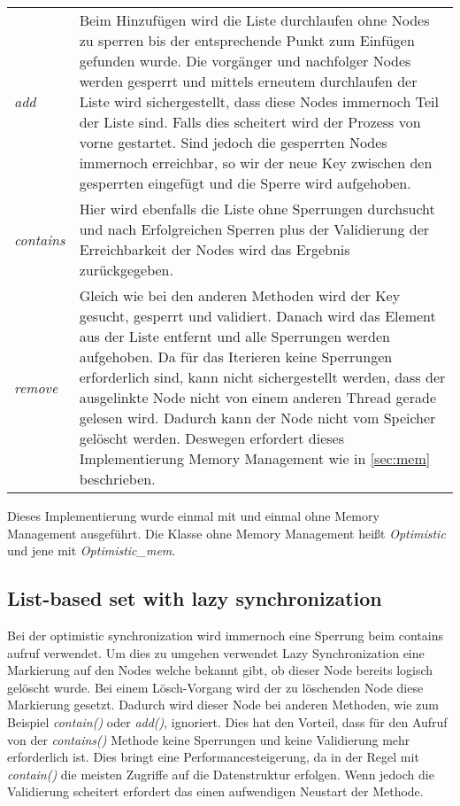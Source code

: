 \begin{table}[H]
    \begin{tabularx}{\textwidth}{lX}
		\textit{add} & Beim Hinzufügen wird die Liste durchlaufen ohne Nodes zu sperren bis der entsprechende Punkt zum Einfügen gefunden wurde. 
		Die vorgänger und nachfolger Nodes werden gesperrt und mittels erneutem durchlaufen der Liste wird sichergestellt, dass diese Nodes immernoch Teil der 
		Liste sind. Falls dies scheitert wird der Prozess von vorne gestartet. Sind jedoch die gesperrten Nodes immernoch erreichbar, so wir der neue Key 
		zwischen den gesperrten eingefügt und die Sperre wird aufgehoben.\\
		\textit{contains} & Hier wird ebenfalls die Liste ohne Sperrungen durchsucht und nach Erfolgreichen Sperren plus der Validierung der Erreichbarkeit 
		der Nodes wird das Ergebnis zurückgegeben.\\
		\textit{remove} & Gleich wie bei den anderen Methoden wird der Key gesucht, gesperrt und validiert. Danach wird das Element aus der Liste entfernt und 
		alle Sperrungen werden aufgehoben. Da für das Iterieren keine Sperrungen erforderlich sind, kann nicht sichergestellt werden, dass der ausgelinkte
		Node nicht von einem anderen Thread gerade gelesen wird. Dadurch kann der Node nicht vom Speicher gelöscht werden. Deswegen erfordert dieses Implementierung Memory Management wie in \ref{sec:mem} beschrieben. \\
    \end{tabularx}
\end{table}

Dieses Implementierung wurde einmal mit und einmal ohne Memory Management ausgeführt. Die Klasse ohne Memory Management heißt \textit{Optimistic} und jene mit \textit{Optimistic\_mem}.

\subsection{List-based set with lazy synchronization}

Bei der optimistic synchronization wird immernoch eine Sperrung beim contains aufruf verwendet. 
Um dies zu umgehen verwendet Lazy Synchronization eine Markierung auf den Nodes welche bekannt gibt, ob dieser Node bereits logisch gelöscht wurde. 
Bei einem Lösch-Vorgang wird der zu löschenden Node diese Markierung gesetzt. Dadurch wird dieser Node bei anderen Methoden, 
wie zum Beispiel \textit{contain()} oder \textit{add()}, ignoriert. Dies hat den Vorteil, 
dass für den Aufruf von der \textit{contains()} Methode keine Sperrungen und keine Validierung mehr erforderlich ist.
Dies bringt eine Performancesteigerung, da in der Regel mit \textit{contain()} die meisten Zugriffe auf die Datenstruktur erfolgen.
Wenn jedoch die Validierung scheitert erfordert das einen aufwendigen Neustart der Methode. 


